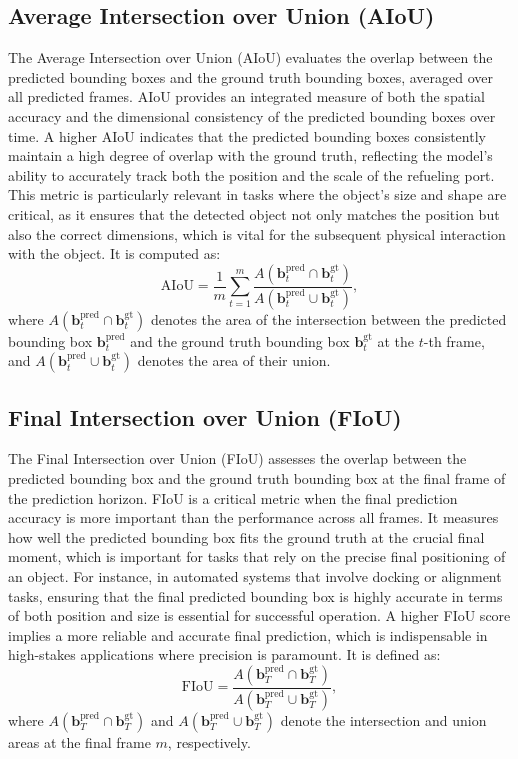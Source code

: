 \documentclass[12pt,oneside]{book} %
\begin{document}
\newpage
\subsection*{Average Intersection over Union (AIoU)}
The Average Intersection over Union (AIoU) evaluates the overlap between the
predicted bounding boxes and the ground truth bounding boxes, averaged over all
predicted frames. AIoU provides an integrated measure of both the spatial
accuracy and the dimensional consistency of the predicted bounding boxes over
time. A higher AIoU indicates that the predicted bounding boxes consistently
maintain a high degree of overlap with the ground truth, reflecting the model’s
ability to accurately track both the position and the scale of the refueling
port. This metric is particularly relevant in tasks where the object’s size and
shape are critical, as it ensures that the detected object not only matches the
position but also the correct dimensions, which is vital for the subsequent
physical interaction with the object. It is computed as:
\begin{equation}
    \text{AIoU} = \frac{1}{m} \sum_{t=1}^{m} \frac{A(\mathbf{b}_t^{\text{pred}} \cap \mathbf{b}_t^{\text{gt}})}{A(\mathbf{b}_t^{\text{pred}} \cup \mathbf{b}_t^{\text{gt}})},
\end{equation}
where \(A(\mathbf{b}_t^{\text{pred}} \cap \mathbf{b}_t^{\text{gt}})\) denotes the area of the intersection between the predicted bounding box \(\mathbf{b}_t^{\text{pred}}\) and the ground truth bounding box \(\mathbf{b}_t^{\text{gt}}\) at the \(t\)-th frame, and \(A(\mathbf{b}_t^{\text{pred}} \cup \mathbf{b}_t^{\text{gt}})\) denotes the area of their union.

\subsection*{Final Intersection over Union (FIoU)}
The Final Intersection over Union (FIoU) assesses the overlap between the
predicted bounding box and the ground truth bounding box at the final frame of
the prediction horizon. FIoU is a critical metric when the final prediction
accuracy is more important than the performance across all frames. It measures
how well the predicted bounding box fits the ground truth at the crucial final
moment, which is important for tasks that rely on the precise final positioning
of an object. For instance, in automated systems that involve docking or
alignment tasks, ensuring that the final predicted bounding box is highly
accurate in terms of both position and size is essential for successful
operation. A higher FIoU score implies a more reliable and accurate final
prediction, which is indispensable in high-stakes applications where precision
is paramount. It is defined as:
\begin{equation}
    \text{FIoU} = \frac{A(\mathbf{b}_T^{\text{pred}} \cap \mathbf{b}_T^{\text{gt}})}{A(\mathbf{b}_T^{\text{pred}} \cup \mathbf{b}_T^{\text{gt}})},
\end{equation}
where \(A(\mathbf{b}_T^{\text{pred}} \cap \mathbf{b}_T^{\text{gt}})\) and \(A(\mathbf{b}_T^{\text{pred}} \cup \mathbf{b}_T^{\text{gt}})\) denote the intersection and union areas at the final frame \(m\), respectively.
\end{document}
